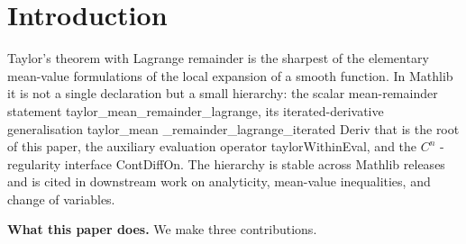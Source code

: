 \documentclass[11pt,reqno]{amsart}
\makeatletter
\let\orig@maketitle\maketitle
\renewcommand{\maketitle}{	\begingroup
	\let\MakeUppercase\@firstofone
	\let\uppercase\@firstofone
	\orig@maketitle
	\endgroup
}
\makeatother
\begin{document}
\maketitle

\thispagestyle{empty}

\newpage \pagestyle{plain}  

\section{Introduction}

\label{sec:introduction}

\noindent Taylor's theorem with Lagrange remainder is the sharpest of the
elementary mean-value formulations of the local expansion of a smooth
function. In Mathlib \cite{mathlib4} it is not a single declaration but a
small hierarchy: the scalar mean-remainder statement \textsf{%
taylor\allowbreak\_mean\allowbreak\_remainder\allowbreak\_lagrange}, its
iterated-derivative generalisation \textsf{taylor\allowbreak\_mean%
\allowbreak\_remainder\allowbreak\_lagrange\allowbreak \_iterated\allowbreak
Deriv} that is the root of this paper, the auxiliary evaluation operator 
\textsf{taylor\allowbreak Within\allowbreak Eval}, and the $C^{n}$%
-regularity interface \textsf{ContDiffOn}. The hierarchy is stable across
Mathlib releases and is cited in downstream work on analyticity, mean-value
inequalities, and change of variables.

\smallskip\noindent\textbf{What this paper does.} We make three
contributions.
\end{document}
